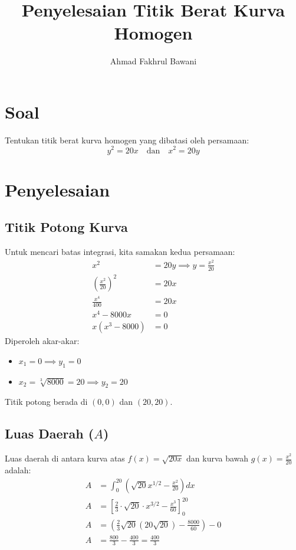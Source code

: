 \documentclass[12pt,a4paper]{article}
\title{Penyelesaian Titik Berat Kurva Homogen}
\author{Ahmad Fakhrul Bawani}
\date{}
\begin{document}
\maketitle

\section{Soal}
Tentukan titik berat kurva homogen yang dibatasi oleh persamaan:
\begin{equation}
  y^2 = 20x \quad \text{dan} \quad x^2 = 20y
\end{equation}

\section{Penyelesaian}

\subsection{Titik Potong Kurva}
Untuk mencari batas integrasi, kita samakan kedua persamaan:
\begin{align*}
  x^2 &= 20y \implies y = \frac{x^2}{20} \\
  \left( \frac{x^2}{20} \right)^2 &= 20x \\
  \frac{x^4}{400} &= 20x \\
  x^4 - 8000x &= 0 \\
  x(x^3 - 8000) &= 0
\end{align*}
Diperoleh akar-akar:
\begin{itemize}
  \item $x_1 = 0 \implies y_1 = 0$
  \item $x_2 = \sqrt[3]{8000} = 20 \implies y_2 = 20$
\end{itemize}
Titik potong berada di $(0,0)$ dan $(20,20)$.

\subsection{Luas Daerah ($A$)}
Luas daerah di antara kurva atas $f(x) = \sqrt{20x}$ dan kurva bawah $g(x) = \frac{x^2}{20}$ adalah:
\begin{align*}
  A &= \int_{0}^{20} \left( \sqrt{20}x^{1/2} - \frac{x^2}{20} \right) dx \\
  A &= \left[ \frac{2}{3} \cdot \sqrt{20} \cdot x^{3/2} - \frac{x^3}{60} \right]_0^{20} \\
  A &= \left( \frac{2}{3} \sqrt{20} (20\sqrt{20}) - \frac{8000}{60} \right) - 0 \\
  A &= \frac{800}{3} - \frac{400}{3} = \frac{400}{3}
\end{align*}
\end{document}
